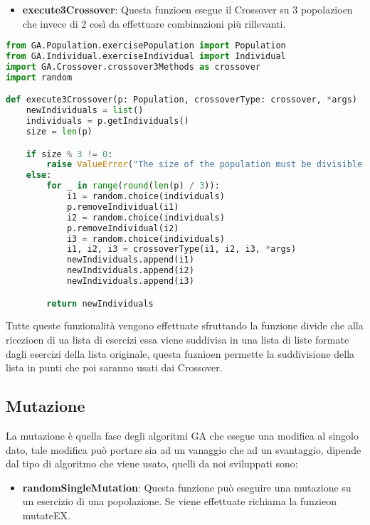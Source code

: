 \documentclass{article}
\begin{document}
\begin{itemize}
\item\textbf{execute3Crossover}: Questa funzioen esegue il Crossover su 3 popolazioen che invece di 2 così da effettuare combinazioni più rillevanti.
\end{itemize}

\begin{lstlisting}[language=Python, breaklines, no caption]
from GA.Population.exercisePopulation import Population
from GA.Individual.exerciseIndividual import Individual
import GA.Crossover.crossover3Methods as crossover
import random

def execute3Crossover(p: Population, crossoverType: crossover, *args) -> list[Individual]:
    newIndividuals = list()
    individuals = p.getIndividuals()
    size = len(p)

    if size % 3 != 0:
        raise ValueError("The size of the population must be divisible by 3!")
    else:
        for _ in range(round(len(p) / 3)):
            i1 = random.choice(individuals)
            p.removeIndividual(i1)
            i2 = random.choice(individuals)
            p.removeIndividual(i2)
            i3 = random.choice(individuals)
            i1, i2, i3 = crossoverType(i1, i2, i3, *args)
            newIndividuals.append(i1)
            newIndividuals.append(i2)
            newIndividuals.append(i3)

        return newIndividuals
\end{lstlisting}

\pagebreak

Tutte queste funzionalità vengono effettuate sfruttando la funzione divide che alla ricezioen di ua lista di esercizi essa viene suddivisa in una lista di liste formate dagli esercizi della lista originale, questa fuznioen permette la suddivisione della lista in punti che poi saranno usati dai Crossover.

\subsection{Mutazione}

La mutazione è quella fase degli algoritmi GA che esegue una modifica al singolo dato, tale modifica può portare sia ad un vanaggio che ad un svantaggio, dipende dal tipo di algoritmo che viene usato, quelli da noi sviluppati sono:

\begin{itemize}
\item\textbf{randomSingleMutation}: Questa funzione può eseguire una mutazione su un esercizio di una popolazione. Se viene effettuate richiama la funzieon mutateEX.
\end{itemize}
\end{document}
